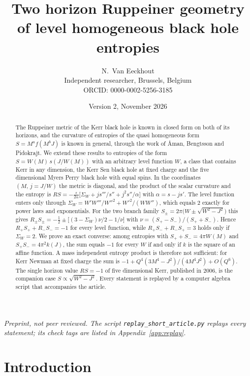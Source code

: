 \documentclass[11pt]{article}
\title{Two horizon Ruppeiner geometry of level homogeneous black hole entropies}
\author{N.~Van Eeckhout\\ \small Independent researcher, Brussels, Belgium\\ \small ORCID: 0000-0002-5256-3185}
\date{Version 2, November 2026}
\theoremstyle{definition}
\theoremstyle{remark}
\newcommand{\SW}{\Sigma_{W}}
\begin{document}
\maketitle

\begin{abstract}
The Ruppeiner metric of the Kerr black hole is known in closed form on both of its horizons, and the curvature of entropies of the quasi homogeneous form $S=M^{a}f(M^{b}J)$ is known in general, through the work of {\AA}man, Bengtsson and Pidokrajt. We extend these results to entropies of the form $S=W(M)\,s(J/W(M))$ with an arbitrary level function $W$, a class that contains Kerr in any dimension, the Kerr Sen black hole at fixed charge and the five dimensional Myers Perry black hole with equal spins. In the coordinates $(M,\,j=J/W)$ the metric is diagonal, and the product of the scalar curvature and the entropy is $RS=-\frac{s}{2\alpha}\bigl[\SW+js'''/s''+j^{2}s''/\alpha\bigr]$ with $\alpha=s-js'$. The level function enters only through $\SW=W'W'''/W''^{2}+W'^{2}/(WW'')$, which equals $2$ exactly for power laws and exponentials. For the two branch family $S_{\pm}=2\pi\bigl(W\pm\sqrt{W^{2}-J^{2}}\bigr)$ this gives $R_{\pm}S_{\pm}=-\tfrac12\pm\bigl[(3-\SW)\nu/2-1/\nu\bigr]$ with $\nu=(S_{+}-S_{-})/(S_{+}+S_{-})$. Hence $R_{+}S_{+}+R_{-}S_{-}=-1$ for every level function, while $R_{+}S_{-}+R_{-}S_{+}=3$ holds only if $\SW=2$. We prove an exact converse: among entropies with $S_{+}+S_{-}=4\pi W(M)$ and $S_{+}S_{-}=4\pi^{2}k(J)$, the sum equals $-1$ for every $W$ if and only if $k$ is the square of an affine function. A mass independent entropy product is therefore not sufficient: for Kerr Newman at fixed charge the sum is $-1+Q^{4}(3M^{4}-J^{2})/(4M^{4}J^{2})+O(Q^{6})$. The single horizon value $RS=-1$ of five dimensional Kerr, published in 2006, is the companion case $S\propto\sqrt{W^{2}-J^{2}}$. Every statement is replayed by a computer algebra script that accompanies the article.
\end{abstract}

\emph{Preprint, not peer reviewed. The script \texttt{replay\_short\_article.py} replays every statement; its check tags are listed in Appendix~\ref{app:replay}.}

\section{Introduction}\label{sec:intro}
\end{document}
